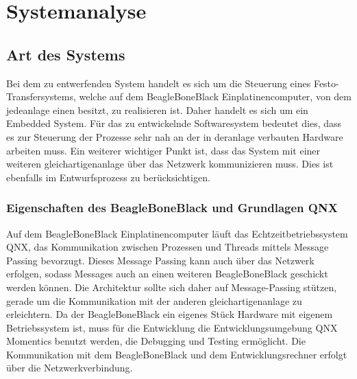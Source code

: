 




















\section{Systemanalyse}\label{sec:systemanalyse}


\subsection{Art des Systems}

Bei dem zu entwerfenden System handelt es sich um die Steuerung eines Festo-Transfersystems,
welche auf dem BeagleBoneBlack Einplatinencomputer, von dem jede\gls{anlage} einen besitzt, zu realisieren ist.
Daher handelt es sich um ein Embedded System.
Für das zu entwickelnde Softwaresystem bedeutet dies, dass es zur Steuerung der Prozesse sehr nah
an der in der\gls{anlage} verbauten Hardware arbeiten muss.
Ein weiterer wichtiger Punkt ist, dass das System mit einer weiteren gleichartigen\gls{anlage} über
das Netzwerk kommunizieren muss. Dies ist ebenfalls im Entwurfsprozess zu berücksichtigen.

\subsubsection{Eigenschaften des BeagleBoneBlack und Grundlagen QNX}

Auf dem BeagleBoneBlack Einplatinencomputer läuft das Echtzeitbetriebssystem QNX, das Kommunikation
zwischen Prozessen und Threads mittels Message Passing bevorzugt.
Dieses Message Passing kann auch über das Netzwerk erfolgen, sodass Messages auch an
einen weiteren BeagleBoneBlack geschickt werden können.
Die Architektur sollte sich daher auf Message-Passing stützen, gerade um die Kommunikation mit der
anderen gleichartigen\gls{anlage} zu erleichtern.
Da der BeagleBoneBlack ein eigenes Stück Hardware mit eigenem Betriebssystem ist, muss für die
Entwicklung die Entwicklungsumgebung QNX Momentics benutzt werden, die Debugging und Testing ermöglicht.
Die Kommunikation mit dem BeagleBoneBlack und dem Entwicklungsrechner erfolgt über die Netzwerkverbindung.


